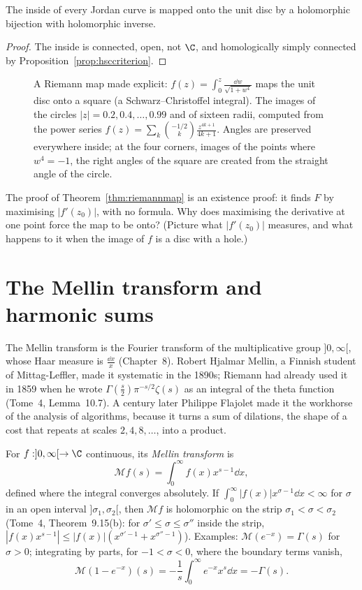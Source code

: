 \begin{corollary}\label{cor:jordanconformal}
The inside of every Jordan curve is mapped onto the unit disc by a holomorphic bijection with holomorphic inverse.
\end{corollary}
\begin{proof}
The inside is connected, open, not $\C$, and homologically simply connected by Proposition~\ref{prop:hsccriterion}.
\end{proof}

\begin{figure}[ht]
\centering
{}
\caption{A Riemann map made explicit: $f(z)=\int_0^z\frac{\dd w}{\sqrt{1+w^4}}$ maps the unit disc onto a square (a Schwarz--Christoffel integral). The images of the circles $|z|=0.2,0.4,\dots,0.99$ and of
sixteen radii, computed from the power series $f(z)=\sum_k\binom{-1/2}k\frac{z^{4k+1}}{4k+1}$. Angles are preserved everywhere inside; at the four corners, images of the points where $w^4=-1$, the right
angles of the square are created from the straight angle of the circle.}
\label{fig:squaremap}
\end{figure}

\begin{think}
The proof of Theorem~\ref{thm:riemannmap} is an existence proof: it finds $F$ by maximising $|f'(z_0)|$, with no formula. Why does maximising the derivative at one point force the map to be onto?
(Picture what $|f'(z_0)|$ measures, and what happens to it when the image of $f$ is a disc with a hole.)
\end{think}

\section{The Mellin transform and harmonic sums}\label{sec:mellin}

The Mellin transform is the Fourier transform of the multiplicative group $]0,\infty[$, whose Haar measure is $\frac{\dd x}x$ (Chapter~8). Robert Hjalmar Mellin, a Finnish student of Mittag-Leffler,
made it systematic in the 1890s; Riemann had already used it in 1859 when he wrote $\Gamma(\frac s2)\pi^{-s/2}\zeta(s)$ as an integral of the theta function (Tome~4, Lemma~10.7). A century later Philippe
Flajolet made it the workhorse of the analysis of algorithms, because it turns a sum of dilations, the shape of a cost that repeats at scales $2,4,8,\dots$, into a product.

For $f:]0,\infty[\to\C$ continuous, its \emph{Mellin transform} is
\[
\mathcal Mf(s)=\int_0^\infty f(x)x^{s-1}\dd x,
\]
defined where the integral converges absolutely. If $\int_0^\infty|f(x)|x^{\sigma-1}\dd x<\infty$ for $\sigma$ in an open interval $]\sigma_1,\sigma_2[$, then $\mathcal Mf$ is holomorphic on the strip $\sigma_1<\sigma<\sigma_2$
(Tome~4, Theorem~9.15(b): for $\sigma'\le\sigma\le\sigma''$ inside the strip, $|f(x)x^{s-1}|\le|f(x)|(x^{\sigma'-1}+x^{\sigma''-1})$). Examples: $\mathcal M(e^{-x})=\Gamma(s)$ for $\sigma>0$; integrating by parts,
for $-1<\sigma<0$, where the boundary terms vanish,
\begin{equation}\label{eq:mellin1me}
\mathcal M(1-e^{-x})(s)=-\frac1s\int_0^\infty e^{-x}x^s\dd x=-\Gamma(s).
\end{equation}

